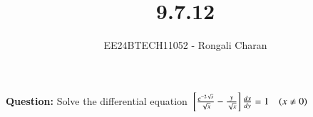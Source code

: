 \documentclass[journal]{IEEEtran}
\begin{document}

\vspace{3cm}

\title{9.7.12}
\author{EE24BTECH11052 - Rongali Charan}
{\let\newpage\relax\maketitle}

\renewcommand{\thefigure}{\theenumi}
\renewcommand{\thetable}{\theenumi}
\setlength{\intextsep}{10pt} %


\renewcommand{\thetable}{\theenumi}
\textbf{Question:}
Solve the differential equation 
${}\left[\frac{e^{-2\sqrt{x}}}{\sqrt{x}} - \frac{y}{\sqrt{x}}\right]\frac{dx}{dy} = 1 \quad (x \neq 0)$
\end{document}
